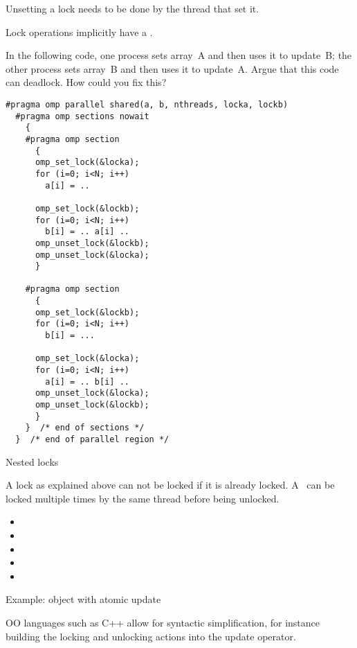 Unsetting a lock needs to be done by the thread that set it.

Lock operations implicitly have a .

\begin{exercise}
  \label{ex:loc-deadlock}
  In the following code, one process sets array~A and then uses it to
  update~B; the other process sets array~B and then uses it to
  update~A.
  Argue that this code can deadlock. How could you fix this?
\begin{lstlisting}
#pragma omp parallel shared(a, b, nthreads, locka, lockb)
  #pragma omp sections nowait
    {
    #pragma omp section
      {
      omp_set_lock(&locka);
      for (i=0; i<N; i++)
        a[i] = ..

      omp_set_lock(&lockb);
      for (i=0; i<N; i++)
        b[i] = .. a[i] ..
      omp_unset_lock(&lockb);
      omp_unset_lock(&locka);
      }

    #pragma omp section
      {
      omp_set_lock(&lockb);
      for (i=0; i<N; i++)
        b[i] = ...

      omp_set_lock(&locka);
      for (i=0; i<N; i++)
        a[i] = .. b[i] ..
      omp_unset_lock(&locka);
      omp_unset_lock(&lockb);
      }
    }  /* end of sections */
  }  /* end of parallel region */
\end{lstlisting}
\end{exercise}

 {Nested locks}

A lock as explained above can not be locked if it is already locked.
A~ can be locked multiple times by the same
thread before being unlocked.

\begin{itemize}
\item {}
\item {}
\item {}
\item {}
\item {}
\end{itemize}

 {Example: object with atomic update}

\ac{OO} languages such as C++ allow for syntactic simplification,
for instance building the locking and unlocking actions into
the update operator.

